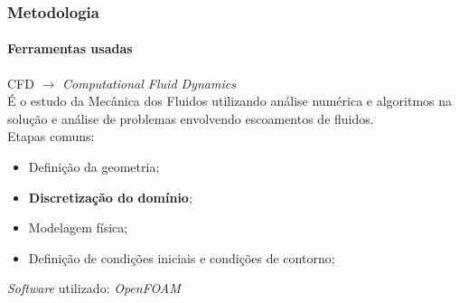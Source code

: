 \documentclass[svgnames,smaller,table]{beamer}
\begin{document}
%
%
%  
\begin{frame}
  \frametitle{Metodologia}
  \framesubtitle{Ferramentas usadas}
  CFD $\rightarrow$ \textit{Computational Fluid Dynamics}
  \\
  \vspace{0.5cm}
  É o estudo da Mecânica dos Fluidos utilizando análise numérica e
  algoritmos na solução e análise de problemas envolvendo escoamentos
  de fluidos.
  \\
  \vspace{0.5cm}
  Etapas comuns:
  \begin{itemize}
  \item Definição da geometria;
  \item \textbf{Discretização do domínio};
  \item Modelagem física;
  \item Definição de condições iniciais e condições de contorno;
  \end{itemize}
  \centering
  \vspace{0.5cm}
  \textit{Software} utilizado: \textit{OpenFOAM}
\end{frame}
\end{document}
